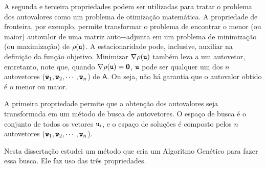 	A segunda e terceira propriedades podem ser utilizadas para tratar o problema dos autovalores como um problema de otimização matemática. A propriedade de fronteira, por exemplo, permite transformar o problema de encontrar o menor (ou maior) autovalor de uma matriz auto$-$adjunta em um problema de minimização (ou maximização) de $\rho(\textbf{\texttt{u}})$. A estacionaridade pode, inclusive, auxiliar na definição da função objetivo. Minimizar $\nabla \rho(\textbf{\texttt{u}})$ também leva a um autovetor, entretanto, note que, quando $\nabla \rho(\textbf{\texttt{u}}) = \textbf{0}$, $\textbf{\texttt{u}}$ pode ser qualquer um dos $n$ autovetores ($\textbf{\texttt{w}}_1, \textbf{\texttt{w}}_2, \cdots, \textbf{\texttt{w}}_n$) de $\mathsf{A}$. Ou seja, não há garantia que o autovalor obtido é o menor ou maior.

		A primeira propriedade permite que a obtenção dos autovalores seja transformada em um método de busca de autovetores. O espaço de busca é o conjunto de todos os vetores $\textbf{\texttt{u}}_i$, e o espaço de soluções é composto pelos $n$ autovetores ($\textbf{\texttt{w}}_1, \textbf{\texttt{w}}_2, \cdots, \textbf{\texttt{w}}_n$).
		
		Nesta dissertação estudei um método que cria um Algoritmo Genético para fazer essa busca. Ele faz uso das três propriedades.